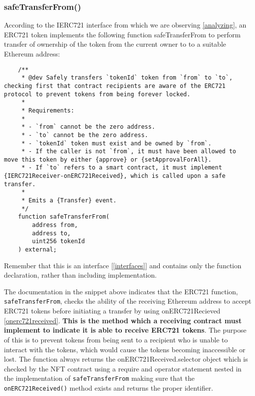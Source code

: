 \documentclass{article}
\theoremstyle{theorem}
\theoremstyle{definition}
\theoremstyle{remark}
\begin{document}
\subsubsection{safeTransferFrom()} \label{safetransferfrom}
According to the IERC721 interface from which we are observing \ref{analyzing}, an ERC721 token implements the following function \colorbox{Gainsboro!60!Lavender}{safeTransferFrom} to perform transfer of ownership of the token from the current owner to to a suitable Ethereum address:

\begin{itemize}
\begin{lstlisting}
    /**
     * @dev Safely transfers `tokenId` token from `from` to `to`, checking first that contract recipients are aware of the ERC721 protocol to prevent tokens from being forever locked.
     *
     * Requirements:
     *
     * - `from` cannot be the zero address.
     * - `to` cannot be the zero address.
     * - `tokenId` token must exist and be owned by `from`.
     * - If the caller is not `from`, it must have been allowed to move this token by either {approve} or {setApprovalForAll}.
     * - If `to` refers to a smart contract, it must implement {IERC721Receiver-onERC721Received}, which is called upon a safe transfer.
     *
     * Emits a {Transfer} event.
     */
    function safeTransferFrom( 
        address from, 
        address to, 
        uint256 tokenId 
    ) external;
\end{lstlisting}
\end{itemize}

\medskip\noindent
Remember that this is an interface [\ref{interfaces}] and contains only the function declaration, rather than including implementation. 

\medskip\noindent
The documentation in the snippet above indicates that the ERC721 function, \texttt{safeTransferFrom}, checks the ability of the receiving Ethereum address to accept ERC721 tokens before initiating a transfer by using \colorbox{Gainsboro!60!Lavender}{onERC721Recieved} \ref{onerc721received}. \textbf{This is the method which a receiving contract must implement to indicate it is able to receive ERC721 tokens}. The purpose of this is to prevent tokens from being sent to a recipient who is unable to interact with the tokens, which would cause the tokens becoming inaccessible or lost. The function always returns the \colorbox{Gainsboro!60!Lavender}{onERC721Received.selector} object which is checked by the NFT contract using a require and operator statement nested in the implementation of  \texttt{safeTransferFrom} making sure that the \texttt{onERC721Received()} method exists and returns the proper identifier.
\end{document}
